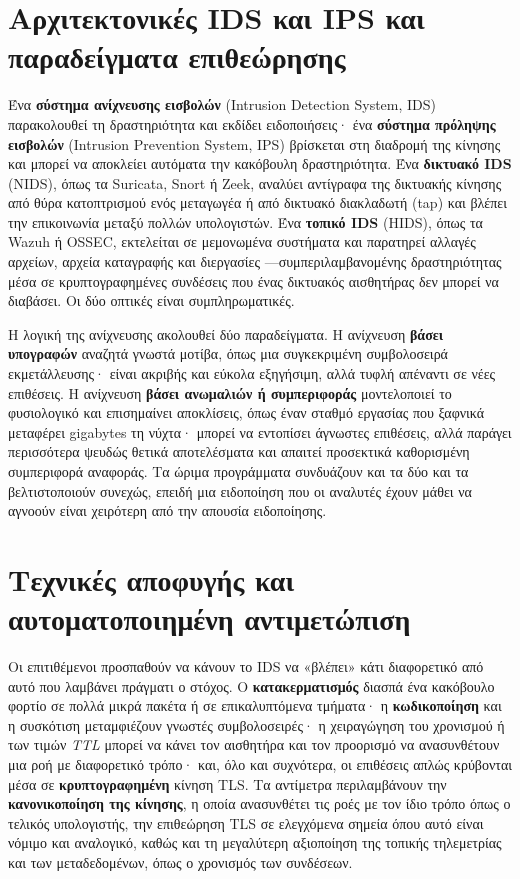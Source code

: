 \documentclass[11pt,openany]{book}
\begin{document}
\section{Αρχιτεκτονικές IDS και IPS και παραδείγματα επιθεώρησης}\label{sec:11.1}
Ένα \textbf{σύστημα ανίχνευσης εισβολών} (Intrusion Detection System, IDS) παρακολουθεί τη δραστηριότητα και εκδίδει ειδοποιήσεις· ένα \textbf{σύστημα πρόληψης εισβολών} (Intrusion Prevention System, IPS) βρίσκεται στη διαδρομή της κίνησης και μπορεί να αποκλείει αυτόματα την κακόβουλη δραστηριότητα. Ένα \textbf{δικτυακό IDS} (NIDS), όπως τα Suricata, Snort ή Zeek, αναλύει αντίγραφα της δικτυακής κίνησης από θύρα κατοπτρισμού ενός μεταγωγέα ή από δικτυακό διακλαδωτή (tap) και βλέπει την επικοινωνία μεταξύ πολλών υπολογιστών. Ένα \textbf{τοπικό IDS} (HIDS), όπως τα Wazuh ή OSSEC, εκτελείται σε μεμονωμένα συστήματα και παρατηρεί αλλαγές αρχείων, αρχεία καταγραφής και διεργασίες —συμπεριλαμβανομένης δραστηριότητας μέσα σε κρυπτογραφημένες συνδέσεις που ένας δικτυακός αισθητήρας δεν μπορεί να διαβάσει. Οι δύο οπτικές είναι συμπληρωματικές.

Η λογική της ανίχνευσης ακολουθεί δύο παραδείγματα. Η ανίχνευση \textbf{βάσει υπογραφών} αναζητά γνωστά μοτίβα, όπως μια συγκεκριμένη συμβολοσειρά εκμετάλλευσης· είναι ακριβής και εύκολα εξηγήσιμη, αλλά τυφλή απέναντι σε νέες επιθέσεις. Η ανίχνευση \textbf{βάσει ανωμαλιών ή συμπεριφοράς} μοντελοποιεί το φυσιολογικό και επισημαίνει αποκλίσεις, όπως έναν σταθμό εργασίας που ξαφνικά μεταφέρει gigabytes τη νύχτα· μπορεί να εντοπίσει άγνωστες επιθέσεις, αλλά παράγει περισσότερα ψευδώς θετικά αποτελέσματα και απαιτεί προσεκτικά καθορισμένη συμπεριφορά αναφοράς. Τα ώριμα προγράμματα συνδυάζουν και τα δύο και τα βελτιστοποιούν συνεχώς, επειδή μια ειδοποίηση που οι αναλυτές έχουν μάθει να αγνοούν είναι χειρότερη από την απουσία ειδοποίησης.

\section{Τεχνικές αποφυγής και αυτοματοποιημένη αντιμετώπιση}\label{sec:11.2}
Οι επιτιθέμενοι προσπαθούν να κάνουν το IDS να «βλέπει» κάτι διαφορετικό από αυτό που λαμβάνει πράγματι ο στόχος. Ο \textbf{κατακερματισμός} διασπά ένα κακόβουλο φορτίο σε πολλά μικρά πακέτα ή σε επικαλυπτόμενα τμήματα· η \textbf{κωδικοποίηση} και η συσκότιση μεταμφιέζουν γνωστές συμβολοσειρές· η χειραγώγηση του χρονισμού ή των τιμών \emph{TTL} μπορεί να κάνει τον αισθητήρα και τον προορισμό να ανασυνθέτουν μια ροή με διαφορετικό τρόπο· και, όλο και συχνότερα, οι επιθέσεις απλώς κρύβονται μέσα σε \textbf{κρυπτογραφημένη} κίνηση TLS. Τα αντίμετρα περιλαμβάνουν την \textbf{κανονικοποίηση της κίνησης}, η οποία ανασυνθέτει τις ροές με τον ίδιο τρόπο όπως ο τελικός υπολογιστής, την επιθεώρηση TLS σε ελεγχόμενα σημεία όπου αυτό είναι νόμιμο και αναλογικό, καθώς και τη μεγαλύτερη αξιοποίηση της τοπικής τηλεμετρίας και των μεταδεδομένων, όπως ο χρονισμός των συνδέσεων.
\end{document}
